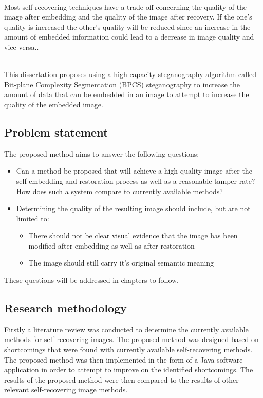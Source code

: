 \documentclass[12pt]{article}
\begin{document}
\hspace{0pt} \\
Most self-recovering techniques have a trade-off concerning the quality of the image after embedding and the quality of the image after recovery.
If the one's quality is increased the other's quality will be reduced since an increase in the amount of embedded information could lead to a decrease in image quality and vice versa..

\hspace{0pt} \\
This dissertation proposes using a high capacity steganography algorithm called Bit-plane Complexity Segmentation (BPCS) steganography to increase the amount of data that can be embedded in an image to attempt to increase the quality of the embedded image.


\subsection{Problem statement}
\label{problemStatement}
The proposed method aims to answer the following questions:
\begin{itemize}
	\item Can a method be proposed that will achieve a high quality image after the self-embedding and restoration process as well as a reasonable tamper rate? How does such a system compare to currently available methods?
	\item Determining the quality of the resulting image should include, but are not limited to: 
	\begin{itemize}
		\item There should not be clear visual evidence that the image has been modified after embedding as well as after restoration
		\item The image should still carry it's original semantic meaning
	\end{itemize}
\end{itemize}
These questions will be addressed in chapters to follow.

\subsection{Research methodology}
Firstly a literature review was conducted to determine the currently available methods for self-recovering images. 
The proposed method was designed based on shortcomings that were found with currently available self-recovering methods. 
The proposed method was then implemented in the form of a Java software application in order to attempt to improve on the identified shortcomings. 
The results of the proposed method were then compared to the results of other relevant self-recovering image methods.
\end{document}
